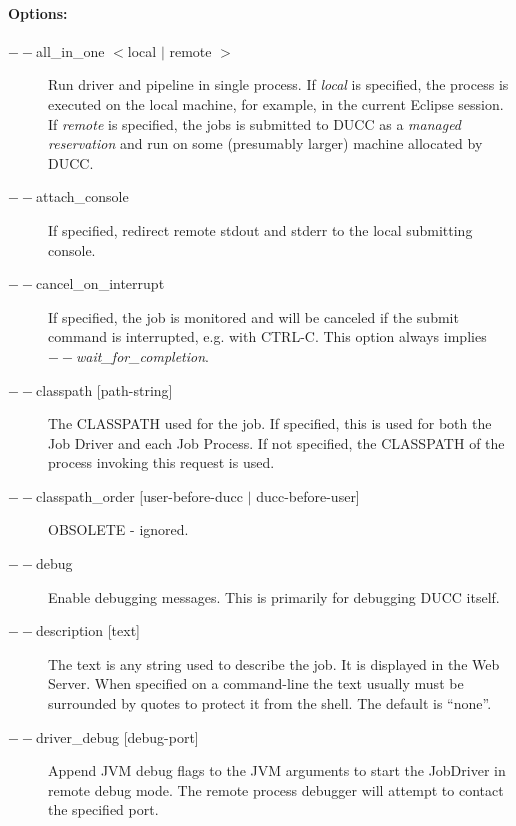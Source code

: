         \paragraph{Options:}
           \begin{description}

           \item[$--$all\_in\_one $<$local $|$ remote $>$]
               Run driver and pipeline in single process.  If {\em local} is specified, the
               process is executed on the local machine, for example, in the current Eclipse session.
               If {\em remote} is specified, the jobs is submitted to DUCC as a {\em managed reservation}
               and run on some (presumably larger) machine allocated by DUCC.

           \item[$--$attach\_console] If specified, redirect remote stdout and stderr
             to the local submitting console.

           \item[$--$cancel\_on\_interrupt] If specified, the job is monitored 
             and will be canceled if the submit command is interrupted, e.g. with CTRL-C. 
             This option always implies {\em $--$wait\_for\_completion}.

           \item[$--$classpath {[path-string]}] The CLASSPATH used for the job.  If specified, this is used
             for both the Job Driver and each Job Process. If not specified, the CLASSPATH of the
             process invoking this request is used.

           \item[$--$classpath\_order {[user-before-ducc $|$ ducc-before-user]} ]  
             OBSOLETE - ignored.

           \item[$--$debug] Enable debugging messages. 
             This is primarily for debugging DUCC itself.

           \item[$--$description {[text]}] The text is any string used to describe the job. It is
             displayed in the Web Server. When specified on a command-line the text usually 
             must be surrounded by quotes to protect it from the shell.  The default is ``none''.

           \item[$--$driver\_debug {[debug-port]}] Append JVM debug flags to the JVM arguments
             to start the JobDriver in remote debug mode.  The remote process debugger will attempt
             to contact the specified port.


\end{description}
